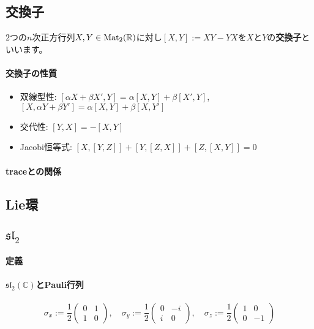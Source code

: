 \subsection{交換子}

$2$つの$n$次正方行列$X, Y \in \operatorname{Mat}_2(\mathbb{R})$に対し$[X, Y] := XY - YX$を$X$と$Y$の\textbf{交換子}といいます。

\paragraph{交換子の性質}

\begin{itemize}
\item 双線型性: $[\alpha X + \beta X', Y] = \alpha[X, Y] + \beta[X', Y]$, $[X, \alpha Y + \beta Y'] = \alpha [X, Y] + \beta [X, Y']$
\item 交代性: $[Y, X] = -[X, Y]$
\item Jacobi恒等式: $[X, [Y, Z]] + [Y, [Z, X]] + [Z, [X, Y]] = 0$
\end{itemize}

\paragraph{traceとの関係}

\subsection{Lie環}

\subsection{$\mathfrak{sl}_2$}

\paragraph{定義}

\paragraph{$\mathfrak{sl}_2(\mathbb{C})$とPauli行列}

\[
\sigma_x := 
\frac{1}{2}
\begin{pmatrix}
0 & 1 \\
1 & 0
\end{pmatrix}, \quad
\sigma_y := 
\frac{1}{2}
\begin{pmatrix}
0 & -i \\
i & 0 
\end{pmatrix}, \quad
\sigma_z := 
\frac{1}{2}
\begin{pmatrix}
1 & 0 \\
0 & -1
\end{pmatrix}
\]

